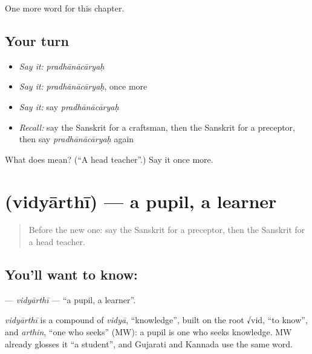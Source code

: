 \begin{grammarlens}[title={What you've built}]
One more word for this chapter.
\end{grammarlens}

\subsection*{Your turn}
\begin{itemize}
\raggedright
  \item \emph{Say it:} \emph{pradhānācāryaḥ}
  \item \emph{Say it:} \emph{pradhānācāryaḥ}, once more
  \item \emph{Say it:} say \emph{pradhānācāryaḥ}
  \item \emph{Recall:} say the Sanskrit for a craftsman, then the Sanskrit for a preceptor, then say \emph{pradhānācāryaḥ} again
\end{itemize}

\begin{tcolorbox}[breakable,colback=teal!4,colframe=teal!35!black,title={Before you move on}]
What does  mean? (\textquotedblleft{}A head teacher\textquotedblright{}.) Say it once more.
\end{tcolorbox}
\section[\texorpdfstring{\sk{विद्यार्थी} (vidyārthī)}{विद्यार्थी (vidyārthī)}]{ (vidyārthī) — a pupil, a learner}

\label{lesson:SA-C210-vidyarthi}



\begin{quote}
Before the new one: say the Sanskrit for a preceptor, then the Sanskrit for a head teacher.
\end{quote}

\subsection*{You'll want to know: }
\textbf{} — \emph{vidyārthī} — \textquotedblleft{}a pupil, a learner\textquotedblright{}.

\begin{cousinweb}
\emph{vidyārthī} is a compound of \emph{vidyā}, \textquotedblleft{}knowledge\textquotedblright{}, built on the root √vid, \textquotedblleft{}to know\textquotedblright{}, and \emph{arthin}, \textquotedblleft{}one who seeks\textquotedblright{} (MW): a pupil is one who seeks knowledge. MW already glosses it \textquotedblleft{}a student\textquotedblright{}, and Gujarati and Kannada use the same word.
\end{cousinweb}

